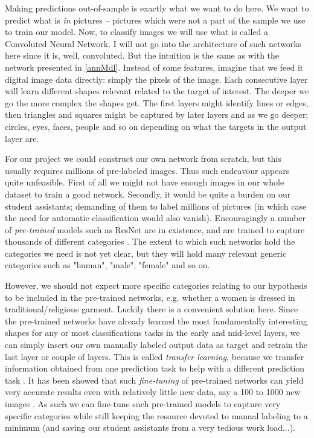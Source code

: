 \documentclass[a4paper]{article}
\begin{document}
Making predictions out-of-sample is exactly what we want to do here. We want to predict what is \emph{in} pictures -- pictures which were not a part of the sample we use to train our model. Now, to classify images we will use what is called a Convoluted Neural Network. I will not go into the architecture of such networks here since it is, well, convoluted. But the intuition is the same as with the network presented in \autoref{annMdl}. Instead of some features, imagine that we feed it digital image data directly: simply the pixels of the image. Each consecutive layer will learn different shapes relevant related to the target of interest. The deeper we go the more complex the shapes get. The first layers might identify lines or edges, then triangles and squares might be captured by later layers and as we go deeper; circles, eyes, faces, people and so on depending on what the targets in the output layer are.\par %

For our project we could construct our own network from scratch, but this usually requires millions of pre-labeled images. Thus such endeavour appears quite unfeasible. First of all we might not have enough images in our whole dataset to train a good network. Secondly, it would be quite a burden on our student assistants; demanding of them to label millions of pictures (in which case the need for automatic classification would also vanish). Encouragingly a number of \emph{pre-trained} models such as ResNet are in existence, and are trained to capture thousands of different categories \cite{williams2019images}. The extent to which such networks hold the categories we need is not yet clear, but they will hold many relevant generic categories such as "human", "male", "female" and so on.\par

However, we should not expect more specific categories relating to our hypothesis to be included in the pre-trained networks, e.g. whether a women is dressed in traditional/religious garment. Luckily there is a convenient solution here. Since the pre-trained networks have already learned the most fundamentally interesting shapes for any or most classifications tasks in the early and mid-level layers, we can simply insert our own manually labeled output data as target and retrain the last layer or couple of layers. This is called \emph{transfer learning}, because we transfer information obtained from one prediction task to help with a different prediction task \cite{williams2019images}. It has been showed that such \emph{fine-tuning} of pre-trained networks can yield very accurate results even with relatively little new data, say a 100 to 1000 new images \cite{williams2019images}. As such we can fine-tune such pre-trained models to capture very specific categories while still keeping the resource devoted to manual labeling to a minimum (and saving our student assistants from a very tedious work load...).\par
\end{document}
